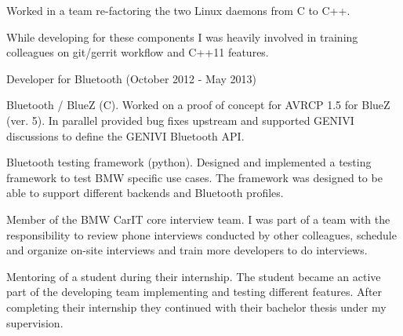 \documentclass[alan.tex]{subfiles}
\begin{document}
\begin{my_desc}
        \begin{my_bullets}
          \item Worked in a team re-factoring the two Linux daemons from C to C++.
          \item While developing for these components I was heavily involved in training colleagues on git/gerrit
              workflow and C++11 features.
        \end{my_bullets}
      \item[Developer] for Bluetooth (October 2012 - May 2013)
        \begin{my_bullets}
        \item Bluetooth / BlueZ (C).  Worked on a proof of concept for AVRCP 1.5 for BlueZ (ver. 5).
            In parallel provided bug fixes upstream and supported GENIVI discussions to define the
            GENIVI Bluetooth API.
          \item Bluetooth testing framework (python). Designed and implemented a testing framework to
            test BMW specific use cases. The framework was designed to be able to support different backends and
            Bluetooth profiles.
        \end{my_bullets}
      \item[Member] of the BMW CarIT core interview team. I was part of a team with the responsibility to review phone interviews
        conducted by other colleagues, schedule and organize on-site interviews and train more developers to do interviews.
      \item[Mentoring] of a student during their internship. The student became an active part of the developing
        team implementing and testing different features. After completing their internship they continued with their bachelor thesis
        under my supervision.
    \end{my_desc}
\end{document}
